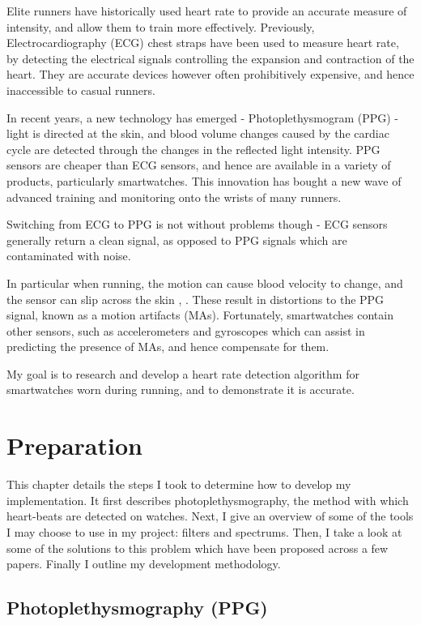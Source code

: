 \documentclass[12pt,a4paper,twoside,openany]{report}
\begin{document}
Elite runners have historically used heart rate to provide an accurate 
measure of intensity, and allow them to train more effectively. 
Previously, Electrocardiography (ECG) chest straps have been 
used to measure heart rate, by detecting the electrical signals controlling 
the expansion and contraction of the heart. They are accurate devices however
often prohibitively expensive, and hence inaccessible to casual runners.

In recent years, a new technology has emerged - Photoplethysmogram (PPG) 
- light is directed at the skin, and blood volume changes caused by the
cardiac cycle are detected through the changes in the reflected light
intensity. PPG sensors are cheaper than ECG sensors, and hence are 
available in a variety of products, particularly smartwatches. This 
innovation has bought a new wave of advanced training and monitoring onto
the wrists of many runners.

Switching from ECG to PPG is not without problems though - ECG sensors generally return a
clean signal, as opposed to PPG signals which are contaminated with
noise.

In particular when running, the motion can cause blood velocity to 
change, and the sensor can slip across the skin \cite{Wijshoff17}, 
\cite{Wood06}. These result in distortions to the PPG signal, known as a
motion artifacts (MAs). Fortunately, smartwatches contain other sensors, such
as accelerometers and gyroscopes which can assist in predicting the presence of 
MAs, and hence compensate for them.

My goal is to research and develop a heart rate detection algorithm
for smartwatches worn during running, and to demonstrate it is accurate.



\chapter{Preparation}

This chapter details the steps I took to determine how to develop my
implementation. It first describes photoplethysmography, the method with which heart-beats are
detected on watches. Next,
I give an overview of some of the tools I may choose to use in my project:
filters and spectrums. Then, I take a look at some of the solutions to this
problem which have been proposed across a few papers. Finally I outline my
development methodology. 

\section{Photoplethysmography (PPG)}
\end{document}
